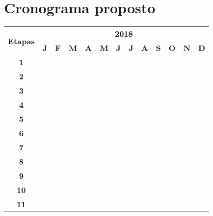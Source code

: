 \section{Cronograma proposto}
\label{cro}

\vspace{0.5cm}
{\tiny
\noindent \begin{tabular}{|c||c|c|c|c|c|c|c|c|c|c|c|c|}
  \hline
  \multirow{2}{*}{\textbf{\small{Etapas}}} & \multicolumn{12}{|c||}{\textbf{\small{2018}}} \\
  \cline{2-13}
   & \textbf{J} & \textbf{F} & \textbf{M} & \textbf{A} & \textbf{M} & \textbf{J} & \textbf{J} & \textbf{A} & \textbf{S} & \textbf{O} & \textbf{N} & \textbf{D} \\
  \hline \hline
  \textbf{\small{1}} & & \cellcolor{black} & & & & & & & & & & \\ \hline
  \textbf{\small{2}} & & & \cellcolor{black} & & & & & & & & & \\ \hline
  \textbf{\small{3}} & & & & \cellcolor{black} & & & & & & & & \\ \hline
  \textbf{\small{4}} & & & & & \cellcolor{black} & & & & & & & \\ \hline
  \textbf{\small{5}} & & & & & & \cellcolor{black} & & & & & & \\ \hline
  \textbf{\small{6}} & & & & & & & \cellcolor{black} & & & & & \\ \hline
  \textbf{\small{7}} & & & & & & & & \cellcolor{black} & & & & \\ \hline
  \textbf{\small{8}} & & & & & & & & & \cellcolor{black} & & & \\ \hline
  \textbf{\small{9}} & & & & & & & & & & \cellcolor{black} & & \\ \hline
  \textbf{\small{10}} & & & & & & & & & & & \cellcolor{black} & \\ \hline
  \textbf{\small{11}} & & & & & & & & & & & & \cellcolor{black} \\ \hline
\end{tabular}
}
